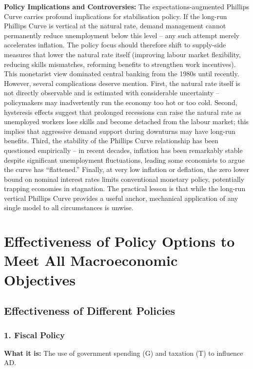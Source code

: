 \documentclass[11pt, a4paper, twoside]{book}
\begin{document}
\textbf{Policy Implications and Controversies:} The expectations-augmented Phillips Curve carries profound implications for stabilisation policy. If the long-run Phillips Curve is vertical at the natural rate, demand management cannot permanently reduce unemployment below this level -- any such attempt merely accelerates inflation. The policy focus should therefore shift to supply-side measures that lower the natural rate itself (improving labour market flexibility, reducing skills mismatches, reforming benefits to strengthen work incentives). This monetarist view dominated central banking from the 1980s until recently. However, several complications deserve mention. First, the natural rate itself is not directly observable and is estimated with considerable uncertainty -- policymakers may inadvertently run the economy too hot or too cold. Second, hysteresis effects suggest that prolonged recessions can raise the natural rate as unemployed workers lose skills and become detached from the labour market; this implies that aggressive demand support during downturns may have long-run benefits. Third, the stability of the Phillips Curve relationship has been questioned empirically -- in recent decades, inflation has been remarkably stable despite significant unemployment fluctuations, leading some economists to argue the curve has ``flattened.'' Finally, at very low inflation or deflation, the zero lower bound on nominal interest rates limits conventional monetary policy, potentially trapping economies in stagnation. The practical lesson is that while the long-run vertical Phillips Curve provides a useful anchor, mechanical application of any single model to all circumstances is unwise.

\section{Effectiveness of Policy Options to Meet All Macroeconomic Objectives}

\subsection{Effectiveness of Different Policies}

\subsubsection{1. Fiscal Policy}

\textbf{What it is:} The use of government spending (G) and taxation (T) to influence AD.
\end{document}
